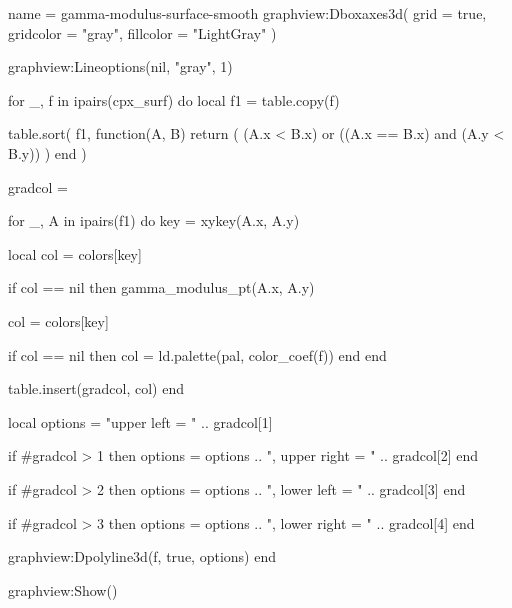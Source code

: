 \documentclass[border = 3pt]{standalone}
\begin{document}
\begin{luadraw*}{name = gamma-modulus-surface-smooth}
graphview:Dboxaxes3d({
  grid      = true,
  gridcolor = "gray",
  fillcolor = "LightGray"
})

graphview:Lineoptions(nil, "gray", 1)

for _, f in ipairs(cpx_surf) do
  local f1 = table.copy(f)

  table.sort(
    f1,
    function(A, B)
      return (
        (A.x < B.x)
        or
        ((A.x == B.x) and (A.y < B.y))
      )
    end
  )

  gradcol = {}

  for _, A in ipairs(f1) do
    key = xykey(A.x, A.y)

    local col = colors[key]

    if col ==  nil then
      gamma_modulus_pt(A.x, A.y)

      col = colors[key]

      if col ==  nil then
        col = ld.palette(pal, color_coef(f))
      end
    end

    table.insert(gradcol, col)
  end

  local options = "upper left = " .. gradcol[1]

  if #gradcol > 1 then
    options = options .. ", upper right = " .. gradcol[2]
  end

  if #gradcol > 2 then
    options = options .. ", lower left = " .. gradcol[3]
  end

  if #gradcol > 3 then
    options = options .. ", lower right = " .. gradcol[4]
  end

  graphview:Dpolyline3d(f, true, options)
end

graphview:Show()
\end{luadraw*}
\end{document}
